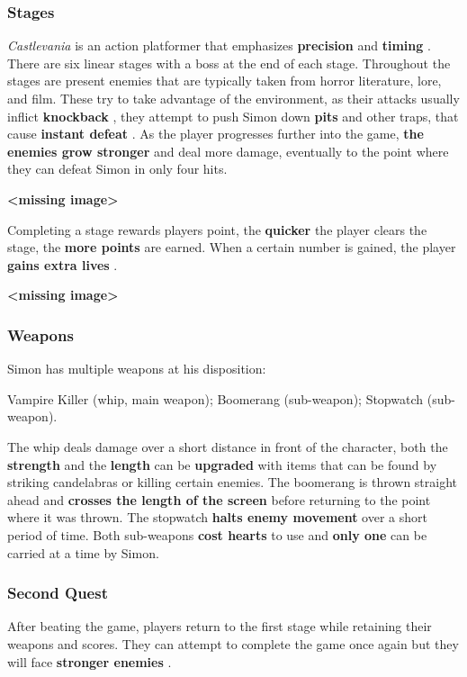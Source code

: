 \documentclass[a4paper,10pt]{book}
\begin{document}
 \subsubsection{Stages }
 
 \textit{Castlevania } is an action platformer that emphasizes  \textbf{precision } 
              and  \textbf{timing } . There are six linear stages with a boss at the end of
              each stage. Throughout the stages are present enemies that are
              typically taken from horror literature, lore, and film. These try to
              take advantage of the environment, as their attacks usually inflict
               \textbf{knockback } , they attempt to push Simon down  \textbf{pits }  and other traps, that
              cause  \textbf{instant defeat } . As the player progresses further into the game,
               \textbf{the enemies grow stronger }  and deal more damage, eventually to the
              point where they can defeat Simon in only four hits. 
 
 
 \textbf{<missing image>}
 
 Completing a stage rewards players point, the  \textbf{quicker }  the player
          clears the stage, the  \textbf{more points }  are earned. When a certain number is
          gained, the player  \textbf{gains extra lives } . 
 
 \textbf{<missing image>}
 
 \subsubsection{Weapons }
 Simon has multiple weapons at his disposition:
           
 Vampire Killer (whip, main weapon); 
 Boomerang (sub-weapon); 
 Stopwatch (sub-weapon). 
 
 
 The whip deals damage over a short distance in front of the
          character, both the  \textbf{strength }  and the  \textbf{length }  can be
           \textbf{upgraded }  with items that can be found by striking candelabras
          or killing certain enemies. 
 The boomerang is thrown straight ahead and  \textbf{crosses the length of
          the screen }  before returning to the point where it was thrown. 
 The stopwatch  \textbf{halts enemy movement }  over a short period of time. 
 Both sub-weapons  \textbf{cost hearts }  to use and  \textbf{only one }  can be carried at
          a time by Simon. 
 \subsubsection{Second Quest }
 After beating the game, players return to the first stage while
             retaining their weapons and scores. They can attempt to complete the
             game once again but they will face  \textbf{stronger enemies } . 
 
\end{document}
